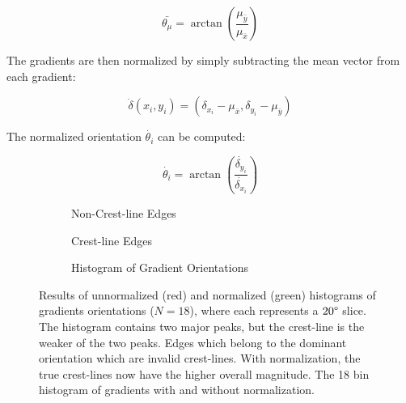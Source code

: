   \begin{equation}
\bar{\theta_{\mu}}=\arctan\left(\frac{\mu_{\bar{y}}}{\mu_{\bar{x}}}\right)
  \end{equation}
  
  The gradients are then normalized by simply subtracting the mean vector from each gradient:
  
  \begin{equation}
\dot{\delta}\left(x_{i},y_{i}\right)=\left(\delta_{x_{i}}-\mu_{\bar{x}},\delta_{y_{i}}-\mu_{\bar{y}}\right)
  \end{equation}
  
  The normalized orientation $\dot{\theta_{i}}$ can be computed:
  
  \begin{equation}
  \dot{\theta_{i}}=\arctan\left(\frac{\dot{\delta_{y_{i}}}}{\dot{\delta_{x_{i}}}}\right)
  \end{equation}

  \begin{figure}
  	\centering
  	\begin{subfigure}{0.48\textwidth}
  		\centering
  		\caption{Non-Crest-line Edges}
  		\label{fig:false_dominant_orientation_image}
  	\end{subfigure}
  	\begin{subfigure}{0.48\textwidth}
  		\centering
  		\caption{Crest-line Edges}
  		\label{fig:true_dominant_orientation_image}
  	\end{subfigure}
  	\begin{subfigure}{\textwidth}
  		\centering
  		\caption{Histogram of Gradient Orientations}
  		\label{fig:dominant_orientation_histogram}
  	\end{subfigure}
  	\caption{Results of unnormalized (red) and normalized (green) histograms of gradients orientations ($N=18$), where each represents a $20\degree$ slice. The histogram contains two major peaks, but the crest-line is the weaker of the two peaks.  Edges which belong to the dominant orientation which are invalid crest-lines.  With normalization, the true crest-lines now have the higher overall magnitude.  The 18 bin histogram of gradients with and without normalization.}
  	\label{fig:computing_dominant_orientation}
  \end{figure}
  
